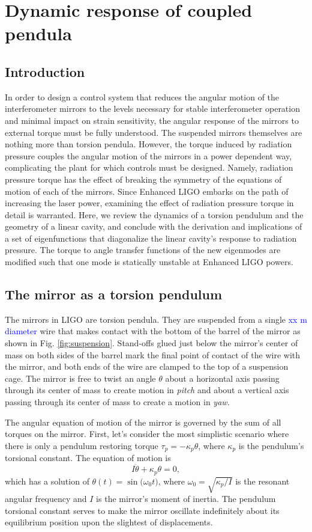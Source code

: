 \chapter{Dynamic response of coupled pendula}
\section{Introduction}
In order to design a control system that reduces the angular motion of
the interferometer mirrors to the levels necessary for stable
interferometer operation and minimal impact on strain sensitivity, the
angular response of the mirrors to external torque must be fully
understood. The suspended mirrors themselves are nothing more than
torsion pendula. However, the torque induced by radiation pressure
couples the angular motion of the mirrors in a power dependent way,
complicating the plant for which controls must be designed. Namely,
radiation pressure torque has the effect of breaking the symmetry of
the equations of motion of each of the mirrors. Since Enhanced LIGO
embarks on the path of increasing the laser power, examining the
effect of radiation pressure torque in detail is warranted. Here, we
review the dynamics of a torsion pendulum and the geometry of a linear
cavity, and conclude with the derivation and implications of a set of
eigenfunctions that diagonalize the linear cavity's response to
radiation pressure. The torque to angle transfer functions of the new
eigenmodes are modified such that one mode is statically unstable at
Enhanced LIGO powers. 



\section{The mirror as a torsion pendulum}
\label{sec:pendTF}
The mirrors in LIGO are torsion pendula. They are suspended from a
single \textcolor{blue}{xx m diameter} wire that makes contact with
the bottom of the barrel of the mirror as shown in
Fig. \ref{fig:suspension}. Stand-offs glued just below the mirror's
center of mass on both sides of the barrel mark the final point of
contact of the wire with the mirror, and both ends of the wire are
clamped to the top of a suspension cage. The mirror is free to twist
an angle $\theta$ about a horizontal axis passing through its center
of mass to create motion in \emph{pitch} and about a vertical axis
passing through its center of mass to create a motion in \emph{yaw}.

The angular equation of motion of the mirror is governed by the sum of
all torques on the mirror. First, let's consider the most simplistic
scenario where there is only a pendulum restoring torque
$\tau_p=-\kappa_p \theta$, where $\kappa_p$ is the pendulum's
torsional constant. The equation of motion is
\begin{equation}
I \ddot{\theta} + \kappa_p \theta = 0,
\end{equation}
which has a solution of $\theta(t) = \sin({\omega_0 t)}$, where
$\omega_0 = \sqrt{\kappa_p/I}$ is the resonant angular frequency and
$I$ is the mirror's moment of inertia. The pendulum torsional constant
serves to make the mirror oscillate indefinitely about its equilibrium
position upon the slightest of displacements.

